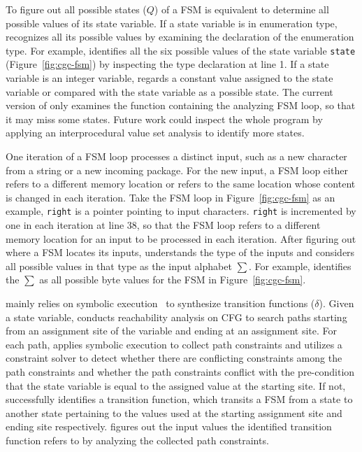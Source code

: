 To figure out all possible states ($Q$) of a FSM 
is equivalent to determine all possible values of its state variable. 
If a state variable is in enumeration type, 
\Tool{} recognizes all its possible values 
by examining the declaration of the enumeration type. 
For example, \Tool{} identifies all the six possible values of 
the state variable \texttt{state} (Figure~\ref{fig:cgc-fsm}) 
by inspecting the type declaration at line 1. 
If a state variable is an integer variable, \Tool{} regards 
a constant value assigned to the state variable or 
compared with the state variable as a possible state. 
The current version of \Tool{} only examines the function
containing the analyzing FSM loop, so that it may miss some states. 
Future work could inspect the whole program by 
applying an interprocedural 
value set analysis to identify more states. 


One iteration of a FSM loop processes a distinct input, 
such as a new character from a string or a new incoming package. 
For the new input, a FSM loop either refers to a different memory location 
or refers to the same location whose content is changed in each iteration.  
Take the FSM loop in Figure~\ref{fig:cgc-fsm} as an example, 
\texttt{right} is a pointer pointing to input characters.
\texttt{right} is incremented by one in each iteration at line 38, 
so that the FSM loop refers to a different memory location 
for an input to be processed in each iteration.  
After figuring out where a FSM locates its inputs, 
\Tool{} understands the type of the inputs 
and considers all possible values in that type
as the input alphabet $\sum$. For example, \Tool{} identifies 
the $\sum$ as all possible byte values 
for the FSM in Figure~\ref{fig:cgc-fsm}. 


\Tool{} mainly relies on symbolic execution~\cite{klee,s2e} 
to synthesize transition functions ($\delta$).  
Given a state variable,
\Tool{} conducts reachability analysis on CFG to search paths starting 
from an assignment site of the variable 
and ending at an assignment site. 
For each path, \Tool{} applies symbolic execution to 
collect path constraints and utilizes a constraint solver to 
detect whether there are conflicting constraints among the path constraints 
and whether the path constraints conflict with the pre-condition 
that the state variable is equal 
to the assigned value at the starting site. 
If not, \Tool{} successfully identifies a transition function, 
which transits a FSM from a state to another state pertaining to 
the values used at the starting assignment 
site and ending site respectively. 
\Tool{} figures out the input values the identified 
transition function refers to 
by analyzing the collected path constraints. 


